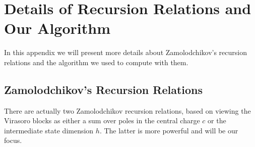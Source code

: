 \documentclass[12pt]{article}
\numberwithin{equation}{section}
\begin{document}
\appendix
\section{Details of Recursion Relations and Our Algorithm}
\label{app:ZRecursion}
In this appendix we will present more details about Zamolodchikov's recursion relations and the algorithm we used to compute with them.

\subsection{Zamolodchikov's Recursion Relations}

There are actually two Zamolodchikov recursion relations, based on viewing the Virasoro blocks as either a sum over poles in the central charge $c$ or the intermediate state dimension $h$.  The latter is more powerful and will be our focus. 
\end{document}

